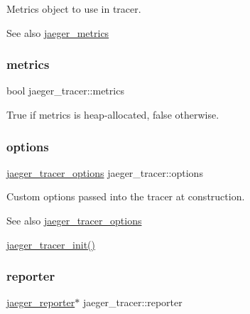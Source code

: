 Metrics object to use in tracer. 

\begin{DoxySeeAlso}{See also}
\mbox{\hyperlink{structjaeger__metrics}{jaeger\+\_\+metrics}} 
\end{DoxySeeAlso}
\mbox{\label{structjaeger__tracer_ad829501be0454a1ede7de6448d923705}} 
\subsubsection{\texorpdfstring{metrics}{metrics}\hspace{0.1cm}{\footnotesize\ttfamily [2/2]}}
{\footnotesize\ttfamily bool jaeger\+\_\+tracer\+::metrics}



True if metrics is heap-\/allocated, false otherwise. 

\mbox{\label{structjaeger__tracer_ac75ef3b2257e8ba0eea1dfb8828ec193}} 
\subsubsection{\texorpdfstring{options}{options}}
{\footnotesize\ttfamily \mbox{\hyperlink{structjaeger__tracer__options}{jaeger\+\_\+tracer\+\_\+options}} jaeger\+\_\+tracer\+::options}



Custom options passed into the tracer at construction. 

\begin{DoxySeeAlso}{See also}
\mbox{\hyperlink{structjaeger__tracer__options}{jaeger\+\_\+tracer\+\_\+options}} 

\mbox{\hyperlink{tracer_8h_a71950927a6d00a35e261c342349b62ec}{jaeger\+\_\+tracer\+\_\+init()}} 
\end{DoxySeeAlso}
\mbox{\label{structjaeger__tracer_ade315b4e4a1bef2bbccee5f9e8bb4f3d}} 
\subsubsection{\texorpdfstring{reporter}{reporter}\hspace{0.1cm}{\footnotesize\ttfamily [1/2]}}
{\footnotesize\ttfamily \mbox{\hyperlink{structjaeger__reporter}{jaeger\+\_\+reporter}}$\ast$ jaeger\+\_\+tracer\+::reporter}



